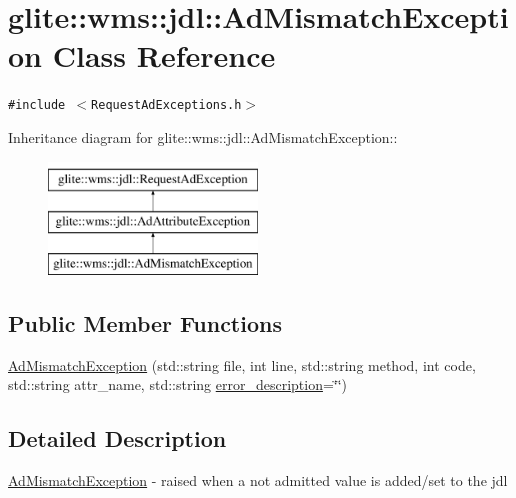 \hypertarget{classglite_1_1wms_1_1jdl_1_1AdMismatchException}{
\section{glite::wms::jdl::Ad\-Mismatch\-Exception Class Reference}
\label{classglite_1_1wms_1_1jdl_1_1AdMismatchException}
}
{\tt \#include $<$Request\-Ad\-Exceptions.h$>$}

Inheritance diagram for glite::wms::jdl::Ad\-Mismatch\-Exception::\begin{figure}[H]
\begin{center}
\leavevmode
\includegraphics[height=3cm]{classglite_1_1wms_1_1jdl_1_1AdMismatchException}
\end{center}
\end{figure}
\subsection*{Public Member Functions}
\begin{CompactItemize}
\item 
\hyperlink{classglite_1_1wms_1_1jdl_1_1AdMismatchException_a0}{Ad\-Mismatch\-Exception} (std::string file, int line, std::string method, int code, std::string attr\_\-name, std::string \hyperlink{classglite_1_1wms_1_1jdl_1_1RequestAdException_p0}{error\_\-description}=\char`\"{}\char`\"{})
\end{CompactItemize}


\subsection{Detailed Description}
\hyperlink{classglite_1_1wms_1_1jdl_1_1AdMismatchException}{Ad\-Mismatch\-Exception} - raised when a not admitted value is added/set to the jdl 



